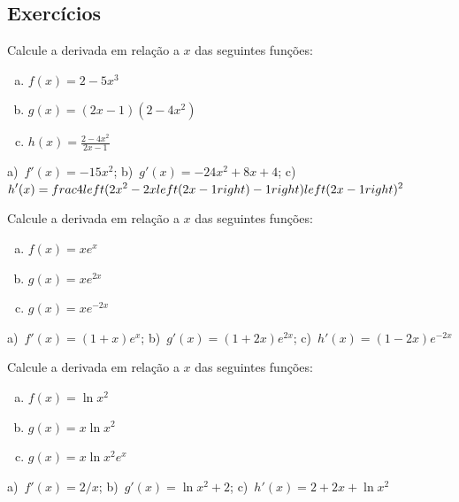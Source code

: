 \subsection*{Exercícios}

\begin{exer}
  Calcule a derivada em relação a $x$ das seguintes funções:
  \begin{enumerate}[a)]
  \item $f(x) = 2 - 5x^3$ \\
  \item $g(x) = (2x-1)(2-4x^2)$
  \item $h(x) = \frac{2-4x^2}{2x-1}$
  \end{enumerate}
\end{exer}
\begin{resp}
  a)~$f'(x) = -15x^2$; b)~$g'(x)=- 24 x^{2} + 8 x + 4$; c)~$\displaystyle h'(x) = \\frac{4 \\left(2 x^{2} - 2 x \\left(2 x - 1\\right) - 1\\right)}{\\left(2 x - 1\\right)^{2}}$
\end{resp}

\begin{ex}
  Calcule a derivada em relação a $x$ das seguintes funções:
  \begin{enumerate}[a)]
  \item $f(x) = xe^x$
  \item $g(x) = xe^{2x}$
  \item $g(x) = xe^{-2x}$
  \end{enumerate}
\end{ex}
\begin{resp}
  a)~$f'(x) = (1+x)e^x$; b)~$g'(x) = (1+2x)e^{2x}$; c)~$h'(x) = (1-2x)e^{-2x}$
\end{resp}

\begin{ex}
  Calcule a derivada em relação a $x$ das seguintes funções:
  \begin{enumerate}[a)]
  \item $f(x) = \ln x^2$
  \item $g(x) = x\ln x^2$
  \item $g(x) = x\ln x^2e^x$
  \end{enumerate}
\end{ex}
\begin{resp}
  a)~$f'(x) = 2/x$; b)~$g'(x) = \ln x^2 + 2$; c)~$h'(x) = 2+2x+\ln x^2$
\end{resp}

